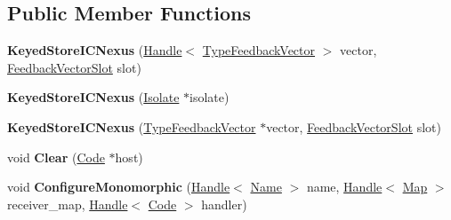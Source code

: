 \subsection*{Public Member Functions}
\begin{DoxyCompactItemize}
\item 
{\bfseries Keyed\+Store\+I\+C\+Nexus} (\hyperlink{classv8_1_1internal_1_1_handle}{Handle}$<$ \hyperlink{classv8_1_1internal_1_1_type_feedback_vector}{Type\+Feedback\+Vector} $>$ vector, \hyperlink{classv8_1_1internal_1_1_feedback_vector_slot}{Feedback\+Vector\+Slot} slot)\hypertarget{classv8_1_1internal_1_1_keyed_store_i_c_nexus_a24362c16bdec839a8b517754cf7e56e2}{}\label{classv8_1_1internal_1_1_keyed_store_i_c_nexus_a24362c16bdec839a8b517754cf7e56e2}

\item 
{\bfseries Keyed\+Store\+I\+C\+Nexus} (\hyperlink{classv8_1_1internal_1_1_isolate}{Isolate} $\ast$isolate)\hypertarget{classv8_1_1internal_1_1_keyed_store_i_c_nexus_a778f563f15668bf47c776673a273274a}{}\label{classv8_1_1internal_1_1_keyed_store_i_c_nexus_a778f563f15668bf47c776673a273274a}

\item 
{\bfseries Keyed\+Store\+I\+C\+Nexus} (\hyperlink{classv8_1_1internal_1_1_type_feedback_vector}{Type\+Feedback\+Vector} $\ast$vector, \hyperlink{classv8_1_1internal_1_1_feedback_vector_slot}{Feedback\+Vector\+Slot} slot)\hypertarget{classv8_1_1internal_1_1_keyed_store_i_c_nexus_a90b5144b48c1d4dd9b4a23082f24b841}{}\label{classv8_1_1internal_1_1_keyed_store_i_c_nexus_a90b5144b48c1d4dd9b4a23082f24b841}

\item 
void {\bfseries Clear} (\hyperlink{classv8_1_1internal_1_1_code}{Code} $\ast$host)\hypertarget{classv8_1_1internal_1_1_keyed_store_i_c_nexus_a9393c159a47d753f3c97bf19e9d23576}{}\label{classv8_1_1internal_1_1_keyed_store_i_c_nexus_a9393c159a47d753f3c97bf19e9d23576}

\item 
void {\bfseries Configure\+Monomorphic} (\hyperlink{classv8_1_1internal_1_1_handle}{Handle}$<$ \hyperlink{classv8_1_1internal_1_1_name}{Name} $>$ name, \hyperlink{classv8_1_1internal_1_1_handle}{Handle}$<$ \hyperlink{classv8_1_1internal_1_1_map}{Map} $>$ receiver\+\_\+map, \hyperlink{classv8_1_1internal_1_1_handle}{Handle}$<$ \hyperlink{classv8_1_1internal_1_1_code}{Code} $>$ handler)\hypertarget{classv8_1_1internal_1_1_keyed_store_i_c_nexus_a0199ec1de0c1e113f71a13019f2eabc9}{}\label{classv8_1_1internal_1_1_keyed_store_i_c_nexus_a0199ec1de0c1e113f71a13019f2eabc9}


\end{DoxyCompactItemize}
